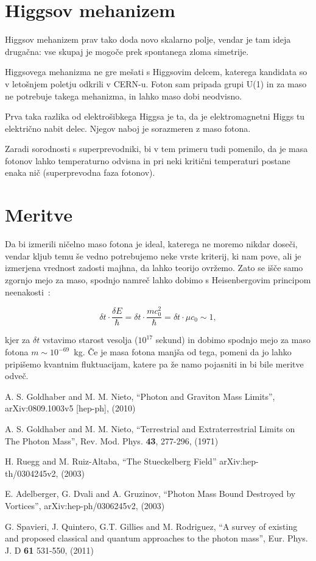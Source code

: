 \documentclass[a4paper, twocolumn, titlepage]{article}
\begin{document}
\section{Higgsov mehanizem}

Higgsov mehanizem prav tako doda novo skalarno polje, vendar je tam ideja druga\v cna: vse skupaj je mogo\v ce prek
spontanega zloma simetrije.

Higgsovega mehanizma ne gre me\v sati s Higgsovim delcem, katerega kandidata so v leto\v snjem poletju odkrili v CERN-u.
Foton sam pripada grupi U(1) in za maso ne potrebuje takega mehanizma, in lahko maso dobi neodvisno.

Prva taka razlika od elektro\v sibkega Higgsa je ta, da je elektromagnetni Higgs tu elektri\v cno nabit delec. Njegov
naboj je sorazmeren z maso fotona.

Zaradi sorodnosti s superprevodniki, bi v tem primeru tudi pomenilo, da je masa fotonov lahko temperaturno odvisna in pri
neki kriti\v cni temperaturi postane enaka ni\v c (superprevodna faza fotonov).

\section{Meritve}

Da bi izmerili ni\v celno maso fotona je ideal, katerega ne moremo nikdar dose\v ci, vendar kljub temu \v se vedno
potrebujemo neke vrste kriterij, ki nam pove, ali je izmerjena vrednost zadosti majhna, da lahko teorijo ovr\v zemo.
Zato se i\v s\v ce samo zgornjo mejo za maso, spodnjo namre\v c lahko dobimo s Heisenbergovim principom
neenakosti~\cite{over}:

\begin{equation}
	\delta t \cdot \frac{\delta E}{\hbar} = \delta t \cdot \frac{mc_0^2}{\hbar} = \delta t \cdot \mu c_0 \sim 1,
\end{equation}

kjer za $\delta t$ vstavimo starost vesolja ($10^{17}$ sekund) in dobimo spodnjo mejo za maso fotona \hbox{$m \sim
10^{-69}$ kg}.
\v Ce je masa fotona manj\v sa od tega, pomeni da jo lahko pripi\v semo kvantnim fluktuacijam, katere pa \v ze namo
pojasniti in bi bile meritve odve\v c.

\begin{thebibliography}{9}
	A. S. Goldhaber and M. M. Nieto,
	"`Photon and Graviton Mass Limits"',
	arXiv:0809.1003v5 [hep-ph],
	(2010)

	A. S. Goldhaber and M. M. Nieto,
	"`Terrestrial and Extraterrestrial Limits on The Photon Mass"',
	Rev. Mod. Phys. {\bf 43}, 277-296,
	(1971)

	H. Ruegg and M. Ruiz-Altaba,
	"`The Stueckelberg Field"'
	arXiv:hep-th/0304245v2,
	(2003)

	E. Adelberger, G. Dvali and A. Gruzinov,
	"`Photon Mass Bound Destroyed by Vortices"',
	arXiv:hep-ph/0306245v2,
	(2003)

	G. Spavieri, J. Quintero, G.T. Gillies and M. Rodriguez,
	"`A survey of existing and proposed classical and quantum approaches to the photon mass"',
	Eur. Phys. J. D {\bf 61} 531-550,
	(2011)
\end{thebibliography}
\end{document}
